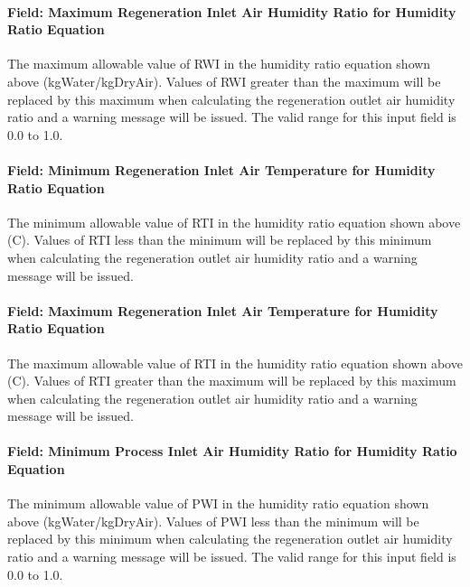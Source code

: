 \paragraph{Field: Maximum Regeneration Inlet Air Humidity Ratio for Humidity Ratio Equation}\label{field-maximum-regeneration-inlet-air-humidity-ratio-for-humidity-ratio-equation}

The maximum allowable value of RWI in the humidity ratio equation shown above (kgWater/kgDryAir). Values of RWI greater than the maximum will be replaced by this maximum when calculating the regeneration outlet air humidity ratio and a warning message will be issued. The valid range for this input field is 0.0 to 1.0.

\paragraph{Field: Minimum Regeneration Inlet Air Temperature for Humidity Ratio Equation}\label{field-minimum-regeneration-inlet-air-temperature-for-humidity-ratio-equation}

The minimum allowable value of RTI in the humidity ratio equation shown above (C). Values of RTI less than the minimum will be replaced by this minimum when calculating the regeneration outlet air humidity ratio and a warning message will be issued.

\paragraph{Field: Maximum Regeneration Inlet Air Temperature for Humidity Ratio Equation}\label{field-maximum-regeneration-inlet-air-temperature-for-humidity-ratio-equation}

The maximum allowable value of RTI in the humidity ratio equation shown above (C). Values of RTI greater than the maximum will be replaced by this maximum when calculating the regeneration outlet air humidity ratio and a warning message will be issued.

\paragraph{Field: Minimum Process Inlet Air Humidity Ratio for Humidity Ratio Equation}\label{field-minimum-process-inlet-air-humidity-ratio-for-humidity-ratio-equation}

The minimum allowable value of PWI in the humidity ratio equation shown above (kgWater/kgDryAir). Values of PWI less than the minimum will be replaced by this minimum when calculating the regeneration outlet air humidity ratio and a warning message will be issued. The valid range for this input field is 0.0 to 1.0.


